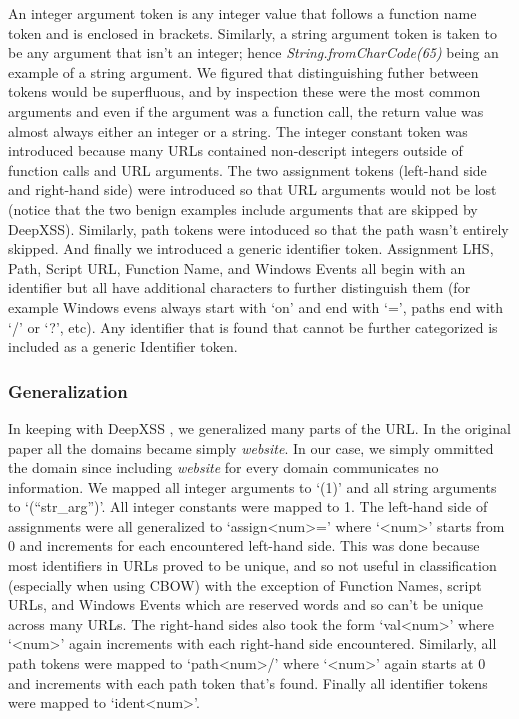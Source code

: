 An integer argument token is any integer value that follows a function name token and is enclosed in brackets. Similarly, a string argument token is taken to be any argument that isn't an integer; hence \textit{String.fromCharCode(65)} being an example of a string argument. We figured that distinguishing futher between tokens would be superfluous, and by inspection these were the most common arguments and even if the argument was a function call, the return value was almost always either an integer or a string. The integer constant token was introduced because many URLs contained non-descript integers outside of function calls and URL arguments. The two assignment tokens (left-hand side and right-hand side) were introduced so that URL arguments would not be lost (notice that the two benign examples include arguments that are skipped by DeepXSS). Similarly, path tokens were intoduced so that the path wasn't entirely skipped. And finally we introduced a generic identifier token. Assignment LHS, Path, Script URL, Function Name, and Windows Events all begin with an identifier but all have additional characters to further distinguish them (for example Windows evens always start with `on' and end with `=', paths end with `/' or `?', etc). Any identifier that is found that cannot be further categorized is included as a generic Identifier token.

\subsubsection{Generalization}
In keeping with DeepXSS \cite{fang2018deepxss}, we generalized many parts of the URL. In the original paper all the domains became simply \textit{website}. In our case, we simply ommitted the domain since including \textit{website} for every domain communicates no information. We mapped all integer arguments to `(1)' and all string arguments to `(``str\_arg'')'. All integer constants were mapped to 1. The left-hand side of assignments were all generalized to `assign<num>=' where `<num>' starts from 0 and increments for each encountered left-hand side. This was done because most identifiers in URLs proved to be unique, and so not useful in classification (especially when using CBOW) with the exception of Function Names, script URLs, and Windows Events which are reserved words and so can't be unique across many URLs. The right-hand sides also took the form `val<num>' where `<num>' again increments with each right-hand side encountered. Similarly, all path tokens were mapped to `path<num>/' where `<num>' again starts at 0 and increments with each path token that's found. Finally all identifier tokens were mapped to `ident<num>'.


